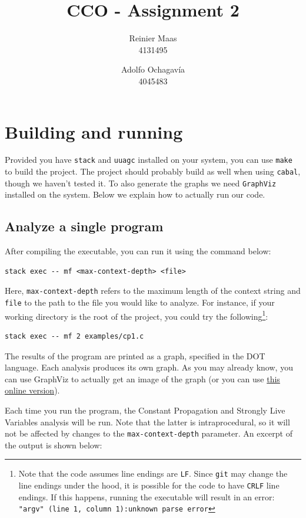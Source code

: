 \documentclass{article}
\author{
  Reinier Maas \\ 4131495
  \and
  Adolfo Ochagavía \\ 4045483
}
\title{CCO - Assignment 2}
\begin{document}
\maketitle

\section{Building and running}

Provided you have \texttt{stack} and \texttt{uuagc} installed on your system, you can use \texttt{make} to build the project.
The project should probably build as well when using \texttt{cabal}, though we haven't tested it.
To also generate the graphs we need \texttt{GraphViz} installed on the system.
Below we explain how to actually run our code.

\subsection*{Analyze a single program}

After compiling the executable, you can run it using the command below:

\begin{verbatim}
stack exec -- mf <max-context-depth> <file>
\end{verbatim}

Here, \texttt{max-context-depth} refers to the maximum length of the context string and \texttt{file} to the path to the file you would like to analyze. For instance, if your working directory is the root of the project, you could try the following\footnote{Note that the code assumes line endings are \texttt{LF}. Since \texttt{git} may change the line endings under the hood, it is possible for the code to have \texttt{CRLF} line endings. If this happens, running the executable will result in an error: \texttt{"argv" (line 1, column 1):unknown parse error}}:

\begin{verbatim}
stack exec -- mf 2 examples/cp1.c
\end{verbatim}

The results of the program are printed as a graph, specified in the DOT language.
Each analysis produces its own graph.
As you may already know, you can use GraphViz to actually get an image of the graph (or you can use \href{http://www.webgraphviz.com/}{this online version}).

Each time you run the program, the Constant Propagation and Strongly Live Variables analysis will be run.
Note that the latter is intraprocedural, so it will not be affected by changes to the \texttt{max-context-depth} parameter.
An excerpt of the output is shown below:
\end{document}
